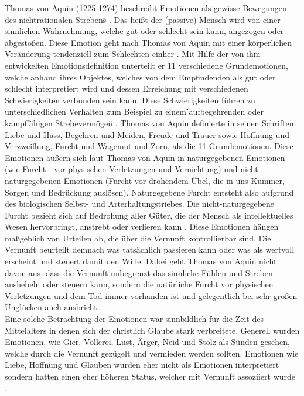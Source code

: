 Thomas von Aquin (1225-1274) beschreibt Emotionen als \"{}gewisse Bewegungen des nichtrationalen Strebens\"{} \cite{forschner_thomas_2006}. Das heißt der (passive) Mensch wird von einer sinnlichen Wahrnehmung, welche gut oder schlecht sein kann, angezogen oder abgestoßen. Diese Emotion geht nach Thomas von Aquin mit einer körperlichen Veränderung tendenziell zum Schlechten einher  \cite{catherine_passion_2009}. Mit Hilfe der von ihm entwickelten Emotionsdefinition unterteilt er 11 verschiedene Grundemotionen, welche anhand ihres Objektes, welches von dem Empfindenden als gut oder schlecht interpretiert wird und dessen Erreichung mit verschiedenen Schwierigkeiten verbunden sein kann. Diese Schwierigkeiten führen zu unterschiedlichen Verhalten zum Beispiel zu einem \"{}aufbegehrenden oder kampffähigen Strebevermögen\"{} \cite{catherine_passion_2009}. Thomas von Aquin definierte in seinen Schriften: Liebe und Hass, Begehren und Meiden, Freude und Trauer sowie Hoffnung und Verzweiflung, Furcht und Wagemut und Zorn, als die 11 Grundemotionen.
Diese Emotionen äußern sich laut Thomas von Aquin in \"{}naturgegebenen\"{} Emotionen (wie Furcht - vor physischen Verletzungen und Vernichtung) und nicht naturgegebenen Emotionen (Furcht vor drohendem Übel, die in uns Kummer, Sorgen und Bedrückung auslösen). Naturgegebene Furcht entsteht also aufgrund des biologischen Selbst- und Arterhaltungstriebes. Die nicht-naturgegebene Furcht bezieht sich auf Bedrohung aller Güter, die der Mensch als intellektuelles Wesen hervorbringt, anstrebt oder verlieren kann \cite{forschner_thomas_2006}. Diese Emotionen hängen maßgeblich von Urteilen ab, die über die Vernunft kontrollierbar sind. Die Vernunft beurteilt demnach was tatsächlich passieren kann oder was als wertvoll erscheint und steuert damit den Wille. Dabei geht Thomas von Aquin nicht davon aus, dass die Vernunft unbegrenzt das sinnliche Fühlen und Streben aushebeln oder steuern kann, sondern die natürliche Furcht vor physischen Verletzungen und dem Tod immer vorhanden ist und gelegentlich bei sehr großen Unglücken auch ausbricht \cite{forschner_thomas_2006}.\\
Eine solche Betrachtung der Emotionen war sinnbildlich für die Zeit des Mittelalters in denen sich der christlich Glaube stark verbreitete. Generell wurden Emotionen, wie Gier, Völlerei, Lust, Ärger, Neid und Stolz als Sünden gesehen, welche durch die Vernunft gezügelt und vermieden werden sollten.  Emotionen wie Liebe, Hoffnung und Glauben wurden eher nicht als Emotionen interpretiert sondern hatten einen eher höheren Status, welcher mit Vernunft assoziiert wurde \cite{robert_c._solomon_philosophy_2008}.\\


